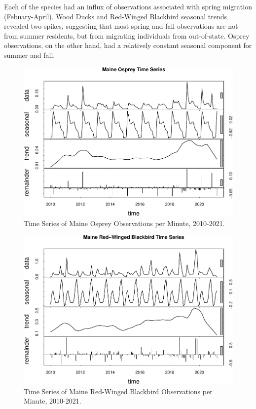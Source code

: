 \documentclass[
  12pt,
]{article}
\begin{document}
Each of the species had an influx of observations associated with spring
migration (Febuary-April). Wood Ducks and Red-Winged Blackbird seasonal
trends revealed two spikes, suggesting that most spring and fall
observations are not from summer residents, but from migrating
individuals from out-of-state. Osprey observations, on the other hand,
had a relatively constant seasonal component for summer and fall.

\begin{figure}
\centering
\includegraphics{Project_report_ME_files/figure-latex/Time.SeriesO-1.pdf}
\caption{Time Series of Maine Osprey Observations per Minute,
2010-2021.}
\end{figure}

\begin{figure}
\centering
\includegraphics{Project_report_ME_files/figure-latex/Time.SeriesR-1.pdf}
\caption{Time Series of Maine Red-Winged Blackbird Observations per
Minute, 2010-2021.}
\end{figure}
\end{document}
